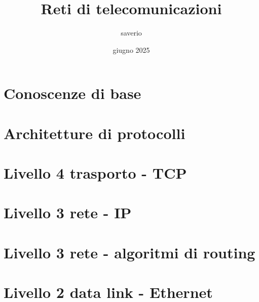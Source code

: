 \documentclass{report}
\title{Reti di telecomunicazioni}
\author{saverio}
\date{giugno 2025}
\begin{document}
\maketitle
\tableofcontents


\chapter{Conoscenze di base}



\chapter{Architetture di protocolli}


\chapter{Livello 4 trasporto - TCP}


\chapter{Livello 3 rete - IP}


\chapter{Livello 3 rete - algoritmi di routing}


\chapter{Livello 2 data link - Ethernet}
\end{document}
